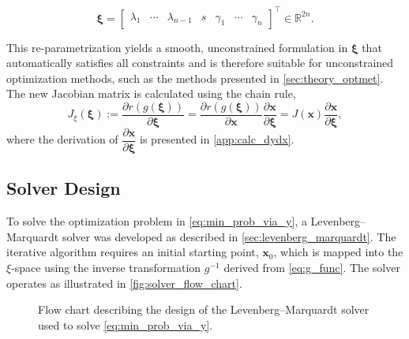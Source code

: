 \begin{equation*}
\bm{\xi}
=
\begin{bmatrix}
    
\lambda_1 & \cdots & \lambda_{n-1} &
s &
\gamma_1 & \cdots & \gamma_n
\end{bmatrix}^\top
\in \mathbb{R}^{2n}.
\end{equation*}

This re-parametrization yields a smooth, unconstrained formulation in $\bm{\xi}$ that automatically satisfies all constraints and is therefore suitable for unconstrained optimization methods, such as the methods presented in \autoref{sec:theory_optmet}.\\

The new Jacobian matrix is calculated using the chain rule,
\begin{equation}
\label{eq:Jy}
    J_\xi(\bm{\xi}):= \frac{\partial r(g(\bm{\xi}))}{\partial\bm{\xi}} 
    = \frac{\partial r(g(\bm{\xi}))}{\partial\mathbf{x}} \frac{\partial \mathbf{x}}{\partial\bm{\xi}}
    = J(\mathbf{x}) \frac{\partial \mathbf{x}}{\partial\bm{\xi}},
\end{equation}
where the derivation of $\dfrac{\partial \mathbf{x}}{\partial\bm{\xi}}$ is presented in \autoref{app:calc_dydx}. 

\newpage
\subsection{Solver Design}
\label{sec:solver_design}

To solve the optimization problem in \cref{eq:min_prob_via_y}, a Levenberg--Marquardt solver was developed as described in \autoref{sec:levenberg_marquardt}. The iterative algorithm requires an initial starting point, $\mathbf{x}_0$, which is mapped into the $\xi$-space using the inverse transformation $g^{-1}$ derived from \cref{eq:g_func}. The solver operates as illustrated in \autoref{fig:solver_flow_chart}.\\

\begin{figure}[h]
    \centering
        
    \caption[Flow chart of the solver design]{Flow chart describing the design of the Levenberg--Marquardt solver used to solve \cref{eq:min_prob_via_y}.}
    \label{fig:solver_flow_chart}
\end{figure}

